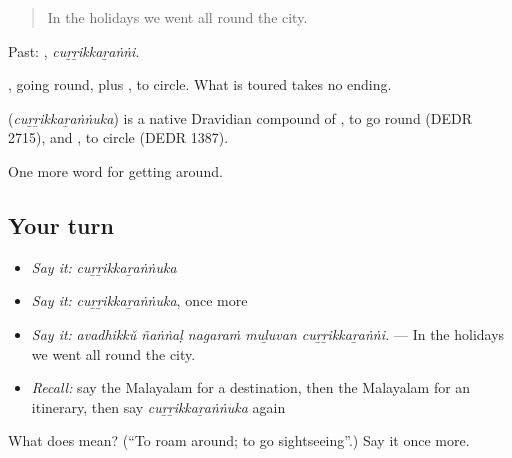 \begin{quote}
In the holidays we went all round the city.
\end{quote}

Past: , \emph{cuṟṟikkaṟaṅṅi}.

, going round, plus , to circle. What is toured takes no ending.

\begin{cousinweb}
\textbf{} (\emph{cuṟṟikkaṟaṅṅuka}) is a native Dravidian compound of , to go round (DEDR 2715), and , to circle (DEDR 1387).
\end{cousinweb}

\begin{grammarlens}[title={What you've built}]
One more word for getting around.
\end{grammarlens}

\subsection*{Your turn}
\begin{itemize}
\raggedright
  \item \emph{Say it:} \emph{cuṟṟikkaṟaṅṅuka}
  \item \emph{Say it:} \emph{cuṟṟikkaṟaṅṅuka}, once more
  \item \emph{Say it:} \emph{avadhikkŭ ñaṅṅaḷ nagaraṁ muḻuvan cuṟṟikkaṟaṅṅi.} — In the holidays we went all round the city.
  \item \emph{Recall:} say the Malayalam for a destination, then the Malayalam for an itinerary, then say \emph{cuṟṟikkaṟaṅṅuka} again
\end{itemize}

\begin{tcolorbox}[breakable,colback=teal!4,colframe=teal!35!black,title={Before you move on}]
What does  mean? (\textquotedblleft{}To roam around; to go sightseeing\textquotedblright{}.) Say it once more.
\end{tcolorbox}
